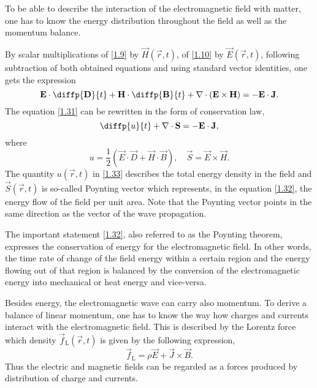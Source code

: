 To be able to describe the interaction of the electromagnetic field with matter, one has to know the energy distribution throughout the field as well as the momentum balance.

By scalar multiplications of \ref{1.9} by $ \vec{H}\left( \vec{r}, t \right) $, of \ref{1.10} by $ \vec{E}\left( \vec{r}, t \right) $, following subtraction of both obtained equations and using standard vector identities, one gets the expression 
\begin{equation}
\label{1.31}
\vec{E} \cdot \diffp{\vec{D}}{t} + \vec{H} \cdot \diffp{\vec{B}}{t} + \div{\left(\vec{E} \times \vec{H} \right)} = -\vec{E} \cdot \vec{J}.
\end{equation}
The equation \ref{1.31} can be rewritten in the form of conservation law,
\begin{equation}
\label{1.32}
\diffp{u}{t} + \div{\vec{S}} = - \vec{E} \cdot \vec{J},
\end{equation}
where
\begin{equation}
\label{1.33}
u = \frac{1}{2} \left(\vec{E} \cdot \vec{D} + \vec{H} \cdot \vec{B} \right), \quad \vec{S} = \vec{E} \times \vec{H}.
\end{equation}
The quantity $ u\left( \vec{r}, t \right) $ in \ref{1.33} describes the total energy density in the field and $ \vec{S}\left( \vec{r}, t \right) $ is so-called Poynting vector which represents, in the equation \ref{1.32}, the energy flow of the field per unit area. Note that the Poynting vector points in the same direction as the vector of the wave propagation.

The important statement \ref{1.32}, also referred to as the Poynting theorem, expresses the conservation of energy for the electromagnetic field. In other words, the time rate of change of the field energy within a certain region and the energy flowing out of that region is balanced by the conversion of the electromagnetic energy into mechanical or heat energy and vice-versa.

Besides energy, the electromagnetic wave can carry also momentum. To derive a balance of linear momentum, one has to know the way how charges and currents interact with the electromagnetic field. This is described by the Lorentz force which density $ \vec{f}_\mathrm{L} \left( \vec{r}, t \right) $ is given by the following expression,
\begin{equation}
\label{1.51}
\vec{f}_\mathrm{L} = \rho \vec{E} + \vec{J} \times \vec{B}.
\end{equation}
Thus the electric and magnetic fields can be regarded as a forces produced by distribution of charge and currents.

